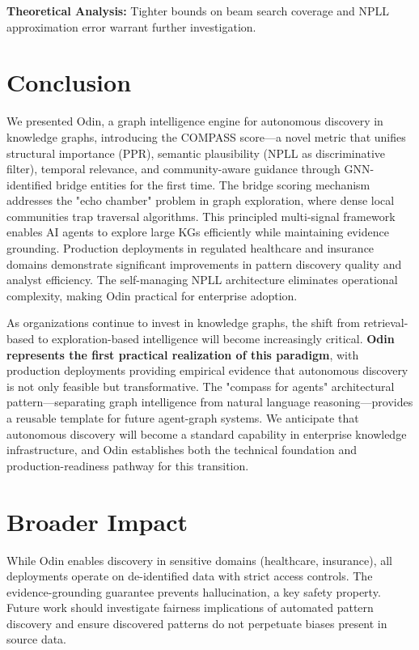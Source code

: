 \documentclass[10pt,twocolumn]{article}
\begin{document}
\textbf{Theoretical Analysis:} Tighter bounds on beam search coverage and NPLL approximation error warrant further investigation.

\section{Conclusion}

We presented Odin, a graph intelligence engine for autonomous discovery in knowledge graphs, introducing the COMPASS score—a novel metric that unifies structural importance (PPR), semantic plausibility (NPLL as discriminative filter), temporal relevance, and community-aware guidance through GNN-identified bridge entities for the first time. The bridge scoring mechanism addresses the "echo chamber" problem in graph exploration, where dense local communities trap traversal algorithms. This principled multi-signal framework enables AI agents to explore large KGs efficiently while maintaining evidence grounding. Production deployments in regulated healthcare and insurance domains demonstrate significant improvements in pattern discovery quality and analyst efficiency. The self-managing NPLL architecture eliminates operational complexity, making Odin practical for enterprise adoption.

As organizations continue to invest in knowledge graphs, the shift from retrieval-based to exploration-based intelligence will become increasingly critical. \textbf{Odin represents the first practical realization of this paradigm}, with production deployments providing empirical evidence that autonomous discovery is not only feasible but transformative. The "compass for agents" architectural pattern---separating graph intelligence from natural language reasoning---provides a reusable template for future agent-graph systems. We anticipate that autonomous discovery will become a standard capability in enterprise knowledge infrastructure, and Odin establishes both the technical foundation and production-readiness pathway for this transition.

\section*{Broader Impact}

While Odin enables discovery in sensitive domains (healthcare, insurance), all deployments operate on de-identified data with strict access controls. The evidence-grounding guarantee prevents hallucination, a key safety property. Future work should investigate fairness implications of automated pattern discovery and ensure discovered patterns do not perpetuate biases present in source data.
\end{document}

